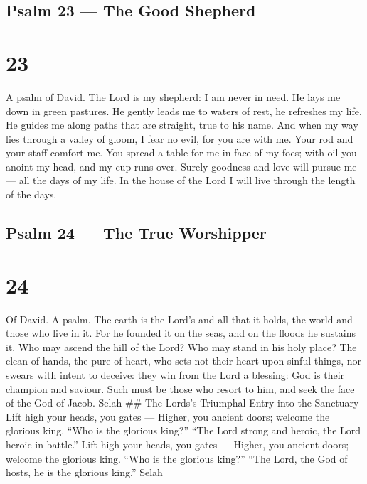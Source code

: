 \hypertarget{psalm-23-the-good-shepherd}{%
\subsection{Psalm 23 --- The Good
Shepherd}\label{psalm-23-the-good-shepherd}}

\hypertarget{section-22}{%
\section{23}\label{section-22}}

A psalm of David.  The Lord is my shepherd: I am never in
need.  He lays me down in green pastures. He gently leads me
to waters of rest,  he refreshes my life. He guides me along
paths that are straight, true to his name.  And when my way
lies through a valley of gloom, I fear no evil, for you are with me.
Your rod and your staff comfort me.  You spread a table for
me in face of my foes; with oil you anoint my head, and my cup runs
over.  Surely goodness and love will pursue me --- all the
days of my life. In the house of the Lord I will live through the length
of the days.

\hypertarget{psalm-24-the-true-worshipper}{%
\subsection{Psalm 24 --- The True
Worshipper}\label{psalm-24-the-true-worshipper}}

\hypertarget{section-23}{%
\section{24}\label{section-23}}

Of David. A psalm.  The earth is the Lord's and all that it
holds, the world and those who live in it.  For he founded
it on the seas, and on the floods he sustains it.  Who may
ascend the hill of the Lord? Who may stand in his holy place?
 The clean of hands, the pure of heart, who sets not their
heart upon sinful things, nor swears with intent to deceive:
 they win from the Lord a blessing: God is their champion
and saviour.  Such must be those who resort to him, and seek
the face of the God of Jacob. Selah \#\# The Lords's Triumphal Entry
into the Sanctuary  Lift high your heads, you gates ---
Higher, you ancient doors; welcome the glorious king.  ``Who
is the glorious king?'' ``The Lord strong and heroic, the Lord heroic in
battle.''  Lift high your heads, you gates --- Higher, you
ancient doors; welcome the glorious king.  ``Who is the
glorious king?'' ``The Lord, the God of hosts, he is the glorious
king.'' Selah

